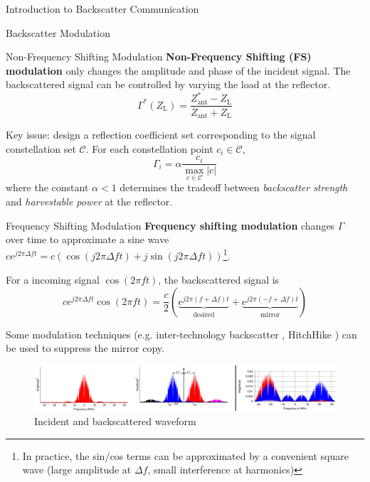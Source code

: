 \documentclass[9pt]{beamer}
\begin{document}
\begin{section}{Introduction to Backscatter Communication}
		\begin{subsection}{Backscatter Modulation}
			\begin{frame}{Non-Frequency Shifting Modulation}
				\textbf{Non-Frequency Shifting (FS) modulation} only changes the amplitude and phase of the incident signal. The backscattered signal can be controlled by varying the load at the reflector.
				\begin{equation}
					\Gamma^*(Z_{\text{L}})=\frac{Z_{\text{ant}}^*-Z_{\text{L}}}{Z_{\text{ant}}+Z_{\text{L}}}
				\end{equation}

				\vspace{1em}

				Key issue: design a reflection coefficient set corresponding to the signal constellation set $\mathcal{C}$. For each constellation point $c_i \in \mathcal{C}$,
				\begin{equation}
					\Gamma_i=\alpha \frac{c_i}{\max_{c \in \mathcal{C}}\lvert{c}\rvert}
				\end{equation}
				where the constant $\alpha<1$ determines the tradeoff between \textit{backscatter strength} and \textit{harvestable power} at the reflector.
			\end{frame}

			\begin{frame}{Frequency Shifting Modulation}
				\textbf{Frequency shifting modulation} changes $\Gamma$ over time to approximate a sine wave $ce^{j2 \pi \Delta ft}=c\left(\cos(j2 \pi \Delta ft)+j\sin(j2 \pi \Delta ft)\right)$\footnote{In practice, the sin/cos terms can be approximated by a convenient square wave (large amplitude at $\Delta f$, small interference at harmonics)}.

				\vspace{1em}

				For a incoming signal $\cos(2 \pi ft)$, the backscattered signal is
				\begin{equation}
					ce^{j2 \pi \Delta ft} \cos(2 \pi ft) = \frac{c}{2}(\underbrace{e^{j2 \pi (f + \Delta f)t}}_{\text{desired}}+\underbrace{e^{j2 \pi (-f + \Delta f)t}}_{\text{mirror}})
				\end{equation}

				Some modulation techniques (e.g. inter-technology backscatter \cite{Iyer2016}, HitchHike \cite{Zhang2016a}) can be used to suppress the mirror copy.

				\begin{figure}
					\centering
					\includegraphics[width=\textwidth]{assets/fs_backscatter.png}
					\caption{Incident and backscattered waveform \cite{Iyer2016,Kellogg2016}}
					\label{fi:fs_backscatter}
				\end{figure}
			\end{frame}
		\end{subsection}


\end{section}
\end{document}
